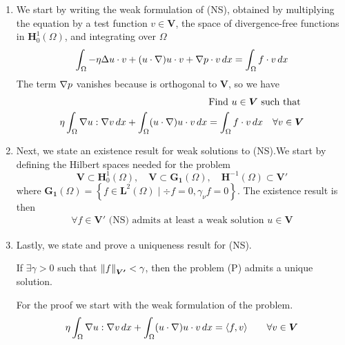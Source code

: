 \begin{enumerate}
    \item We start by writing the weak formulation of (NS), obtained by multiplying the
          equation by a test function \(v \in \bm{V}\), the space of divergence-free
          functions in \(\bm{H}^1_0(\Omega)\), and integrating over \(\Omega\)
          \[
              \begin{split}
                  \int_\Omega -\eta \Delta u \cdot v + (u \cdot \nabla) u \cdot v + \nabla p \cdot v \, dx = \int_\Omega f \cdot v \, dx
              \end{split}
          \]
          The term \(\nabla p\) vanishes because is orthogonal to \(\bm{V}\), so we have
          \[
              \begin{split}
                  \text{Find } u \in \bm{V} \text{ such that } \\
                  \eta \int_\Omega \nabla u : \nabla v \, dx + \int_\Omega (u \cdot \nabla) u \cdot v \, dx = \int_\Omega f \cdot v \, dx \quad \forall v \in \bm{V}
              \end{split}
          \]
    \item Next, we state an existence result for weak solutions to (NS).We start by
          defining the Hilbert spaces needed for the problem
          \[
              \bm{V} \subset \bm{H}^1_0(\Omega), \quad \bm{V} \subset \bm{G_1}(\Omega), \quad \bm{H}^{-1}(\Omega) \subset \bm{V'}
          \]
          where \(\bm{G_1}(\Omega) = \left\{f \in \bm{L}^2(\Omega) \mid \div f = 0,
          \gamma_\nu f = 0 \right\}\). The existence result is then
          \[
              \begin{split}
                  \forall f \in \bm{V'} \text{ (NS) admits at least a weak solution } u \in \bm{V}
              \end{split}
          \]
    \item Lastly, we state and prove a uniqueness result for (NS).
          \begin{remark}
              If \(\exists \gamma > 0\) such that \(\norm{f}_{\bm{V'}} < \gamma\), then the problem (P) admits a unique solution.
          \end{remark}
          For the proof we start with the weak formulation of the problem.
          \[
              \begin{split}
                  \eta \int_\Omega \grad u : \grad v \, dx + \int_\Omega (u \cdot \grad) u \cdot v \, dx = \langle f, v \rangle \qquad \forall v \in \bm{V}

\end{split}\]
\end{enumerate}
